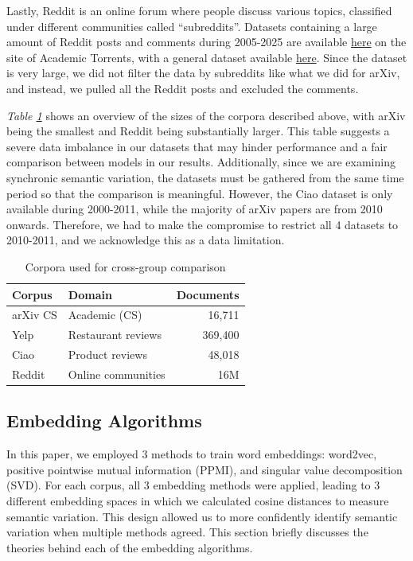 \documentclass[11pt]{article}
\begin{document}
Lastly, Reddit is an online forum where people discuss various topics, classified under different communities called ``subreddits''. Datasets containing a large amount of Reddit posts and comments during 2005-2025 are available \href{https://academictorrents.com/}{here} on the site of Academic Torrents, with a general dataset available \href{https://academictorrents.com/details/ba051999301b109eab37d16f027b3f49ade2de13}{here}. Since the dataset is very large, we did not filter the data by subreddits like what we did for arXiv, and instead, we pulled all the Reddit posts and excluded the comments.

\textit{Table \ref{tab:corpora}} shows an overview of the sizes of the corpora described above, with arXiv being the smallest and Reddit being substantially larger. This table suggests a severe data imbalance in our datasets that may hinder performance and a fair comparison between models in our results. Additionally, since we are examining synchronic semantic variation, the datasets must be gathered from the same time period so that the comparison is meaningful. However, the Ciao dataset is only available during 2000-2011, while the majority of arXiv papers are from 2010 onwards. Therefore, we had to make the compromise to restrict all 4 datasets to 2010-2011, and we acknowledge this as a data limitation.

\begin{table}[t]
    \centering
    \begin{tabular}{llr}
        \toprule
        Corpus & Domain & Documents \\
        \midrule
        arXiv CS & Academic (CS) & 16,711 \\
        Yelp     & Restaurant reviews & 369,400 \\
        Ciao     & Product reviews & 48,018 \\
        Reddit   & Online communities & 16M \\
        \bottomrule
    \end{tabular}
    \caption{Corpora used for cross-group comparison}
    \label{tab:corpora}
\end{table}

\subsection{Embedding Algorithms}

In this paper, we employed 3 methods to train word embeddings: word2vec, positive pointwise mutual information (PPMI), and singular value decomposition (SVD). For each corpus, all 3 embedding methods were applied, leading to 3 different embedding spaces in which we calculated cosine distances to measure semantic variation. This design allowed us to more confidently identify semantic variation when multiple methods agreed. This section briefly discusses the theories behind each of the embedding algorithms.
\end{document}
